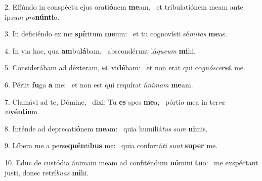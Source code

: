 2. Effúndo in conspéctu ejus orati\textbf{ó}nem \textbf{me}am, \ast\  et tribulatiónem meam ante ip\textit{sum} \textit{pro}\textbf{nún}\textbf{ti}o.\

3. In deficiéndo ex me \textbf{spí}ritum \textbf{me}um: \ast\  et tu cognovísti sé\textit{mi}\textit{tas} \textbf{me}as.\

4. In via hac, qua \textbf{am}bu\textbf{lá}bam, \ast\  abscondérunt lá\textit{que}\textit{um} \textbf{mi}hi.\

5. Considerábam ad déxteram, \textbf{et} vi\textbf{dé}bam: \ast\  et non erat qui co\textit{gnó}\textit{sce}\textbf{ret} me.\

6. Périit \textbf{fu}ga \textbf{a} me: \ast\  et non est qui requírat á\textit{ni}\textit{mam} \textbf{me}am.\

7. Clamávi ad te, Dómine, \dag\  dixi: Tu \textbf{es} spes \textbf{me}a, \ast\  pórtio mea in ter\textit{ra} \textit{vi}\textbf{vén}\textbf{ti}um.\

8. Inténde ad deprecati\textbf{ó}nem \textbf{me}am: \ast\  quia humiliá\textit{tus} \textit{sum} \textbf{ni}mis.\

9. Líbera me a perse\textbf{quén}ti\textbf{bus} me: \ast\  quia confortá\textit{ti} \textit{sunt} \textbf{su}\textbf{per} me.\

10. Educ de custódia ánimam meam ad confiténdum \textbf{nó}mini \textbf{tu}o: \ast\  me exspéctant justi, donec retrí\textit{bu}\textit{as} \textbf{mi}hi.\

